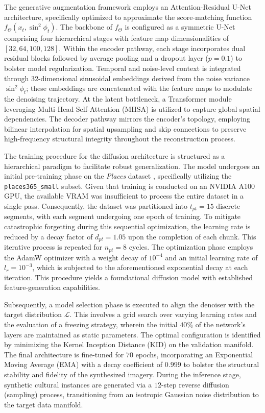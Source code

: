 The generative augmentation framework employs an Attention-Residual U-Net architecture, specifically optimized to approximate the score-matching function $f_\Theta(x_t, \sin^2\phi_t)$. 
The backbone of $f_\Theta$ is configured as a symmetric U-Net comprising four hierarchical stages with feature map dimensionalities of $[32, 64, 100, 128]$.
Within the encoder pathway, each stage incorporates dual residual blocks followed by average pooling and a dropout layer ($p=0.1$) to bolster model regularization. 
Temporal and noise-level context is integrated through 32-dimensional sinusoidal embeddings derived from the noise variance $\sin^2\phi_t$; these embeddings are concatenated with the feature maps to modulate the denoising trajectory. At the latent bottleneck, a Transformer module leveraging Multi-Head Self-Attention (MHSA) is utilized to capture global spatial dependencies. The decoder pathway mirrors the encoder's topology, employing bilinear interpolation for spatial upsampling and skip connections to preserve high-frequency structural integrity throughout the reconstruction process.

The training procedure for the diffusion architecture is structured as a hierarchical paradigm to facilitate robust generalization. 
The model undergoes an initial pre-training phase on the \textit{Places} dataset \citep{zhou2017places}, specifically utilizing the \texttt{places365\_small} subset.
Given that training is conducted on an NVIDIA A100 GPU, the available VRAM was insufficient to process the entire dataset in a single pass. 
Consequently, the dataset was partitioned into $t_{pt}=15$ discrete segments, with each segment undergoing one epoch of training. To mitigate catastrophic forgetting during this sequential optimization, the learning rate is reduced by a decay factor of $d_{pt}=1.05$ upon the completion of each chunk. 
This iterative process is repeated for $n_{pt}=8$ cycles.
The optimization phase employs the AdamW optimizer with a weight decay of $10^{-4}$ and an initial learning rate of $l_r = 10^{-3}$, which is subjected to the aforementioned exponential decay at each iteration. 
This procedure yields a foundational diffusion model with established feature-generation capabilities.

Subsequently, a model selection phase is executed to align the denoiser with the target distribution $\mathcal{L}$. 
This involves a grid search over varying learning rates and the evaluation of a freezing strategy, wherein the initial $40\%$ of the network's layers are maintained as static parameters. 
The optimal configuration is identified by minimizing the Kernel Inception Distance (KID) on the validation manifold.
The final architecture is fine-tuned for $70$ epochs, incorporating an Exponential Moving Average (EMA) with a decay coefficient of $0.999$ to bolster the structural stability and fidelity of the synthesized imagery. 
During the inference stage, synthetic cultural instances are generated via a $12$-step reverse diffusion (sampling) process, transitioning from an isotropic Gaussian noise distribution to the target data manifold.

